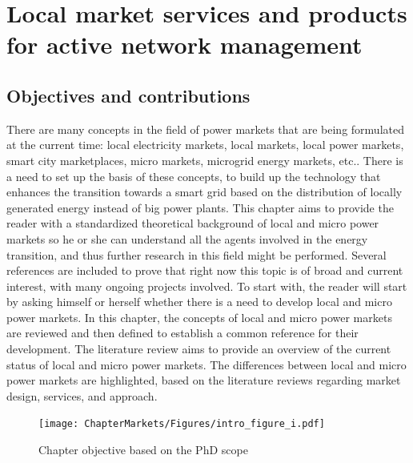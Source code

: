 \renewcommand\labelenumi{(\roman{enumi})}
\renewcommand\theenumi\labelenumi

\chapter{Local market services and products for active network management}
\label{chapterMarkets}

\section{Objectives and contributions}
There are many concepts in the field of power markets that are being formulated at the current time: local electricity markets, local markets, local power markets, smart city marketplaces, micro markets, microgrid energy markets, etc.. There is a need to set up the basis of these concepts, to build up the technology that enhances the transition towards a smart grid based on the distribution of locally generated energy instead of big power plants.
This chapter aims to provide the reader with a standardized theoretical background of local and micro power markets so he or she can understand all the agents involved in the energy transition, and thus further research in this field might be performed. Several references are included to prove that right now this topic is of broad and current interest, with many ongoing projects involved.
To start with, the reader will start by asking himself or herself whether there is a need to develop local and micro power markets.
In this chapter, the concepts of local and micro power markets are reviewed and then defined to establish a common reference for their development. The literature review aims to provide an overview of the current status of local and micro power markets. The differences between local and micro power markets are highlighted, based on the literature reviews regarding market design, services, and approach.

\begin{figure}[htbp]
	\centering
	\texttt{[image: ChapterMarkets/Figures/intro\_figure\_i.pdf]}
		\caption{Chapter objective based on the PhD scope}
	\label{fig:chapter_obj}  
\end{figure}


